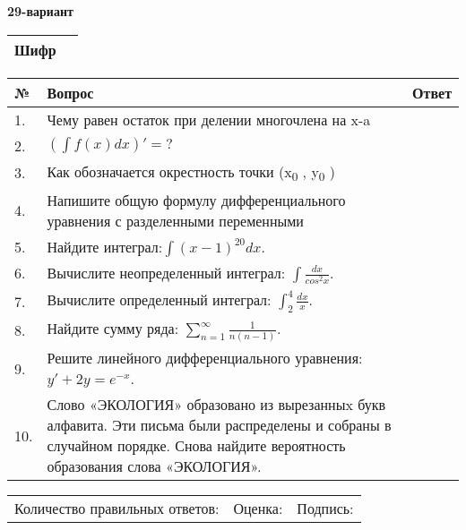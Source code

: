 \documentclass{article}
\begin{document}
  \egroup
  
  \newpage
  
  
  \textbf{29-вариант}\\
  
  \bgroup
  \def\arraystretch{1.6} %
  
  \begin{tabular}{|m{5.7cm}|m{9.5cm}|}
  \hline
  Шифр & \\
  \hline
  \end{tabular}
  
  \vspace{1cm}
  
  \begin{tabular}{|m{0.7cm}|m{10cm}|m{4cm}|}
  \hline
  № & Вопрос & Ответ \\
  \hline
  1. & Чему равен остаток при делении многочлена на x-a &  \\
  \hline
  2. & \(\left( \int{f(x)dx} \right)' = ?\) &  \\
  \hline
  3. & Как обозначается окрестность точки (x\textsubscript{0} , y\textsubscript{0} ) &  \\
  \hline
  4. & Напишите общую формулу дифференциального уравнения с разделенными переменными &  \\
  \hline
  5. & Найдите интеграл:\(\int{(x - 1)^{20}}dx\). &  \\
  \hline
  6. & Вычислите неопределенный интеграл: \(\int\frac{dx}{cos^{2}x}\). &  \\
  \hline
  7. & Вычислите определенный интеграл: \(\int_{2}^{4}\frac{dx}{x}\). &  \\
  \hline
  8. & Найдите сумму ряда: \(\sum_{n = 1}^{\infty}\frac{1}{n(n - 1)}\). &  \\
  \hline
  9. & Решите линейного дифференциального уравнения: \(y' + 2y = e^{- x}\). &  \\
  \hline
  10. & Слово «ЭКОЛОГИЯ» образовано из вырезанныx букв алфавита. Эти письма были распределены и собраны в случайном порядке. Снова найдите вероятность образования слова «ЭКОЛОГИЯ». &  \\
  \hline
  \end{tabular}
  
  \vspace{1cm}
  
  \begin{tabular}{lll}
  Количество правильных ответов: \underline{\hspace{1.5cm}} & 
  Оценка: \underline{\hspace{1.5cm}} & 
  Подпись: \underline{\hspace{2cm}} \\
  \end{tabular}
  
\end{document}
